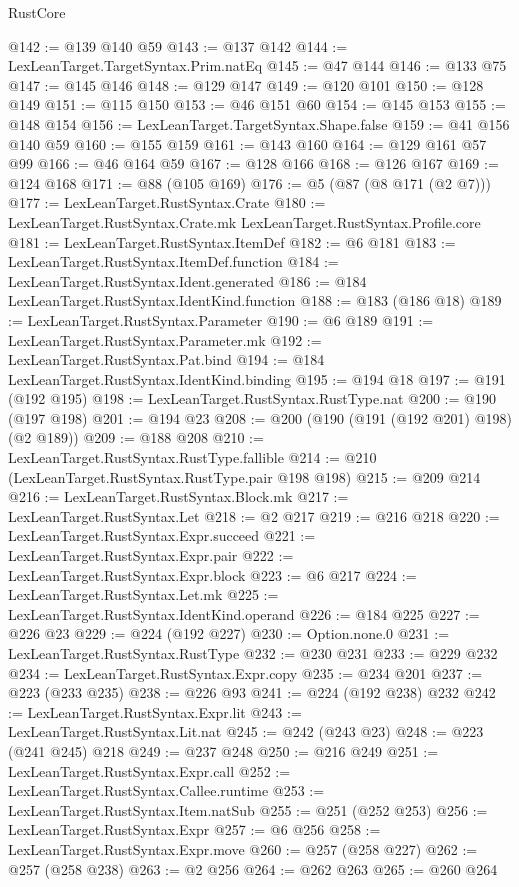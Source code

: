 \begin{lexlean}{RustCore}
\begin{coremodule}
@142 := @139 @140 @59
@143 := @137 @142
@144 := LexLeanTarget.TargetSyntax.Prim.natEq
@145 := @47 @144
@146 := @133 @75
@147 := @145 @146
@148 := @129 @147
@149 := @120 @101
@150 := @128 @149
@151 := @115 @150
@153 := @46 @151 @60
@154 := @145 @153
@155 := @148 @154
@156 := LexLeanTarget.TargetSyntax.Shape.false
@159 := @41 @156 @140 @59
@160 := @155 @159
@161 := @143 @160
@164 := @129 @161 @57 @99
@166 := @46 @164 @59
@167 := @128 @166
@168 := @126 @167
@169 := @124 @168
@171 := @88 (@105 @169)
@176 := @5 (@87 (@8 @171 (@2 @7)))
@177 := LexLeanTarget.RustSyntax.Crate
@180 := LexLeanTarget.RustSyntax.Crate.mk LexLeanTarget.RustSyntax.Profile.core
@181 := LexLeanTarget.RustSyntax.ItemDef
@182 := @6 @181
@183 := LexLeanTarget.RustSyntax.ItemDef.function
@184 := LexLeanTarget.RustSyntax.Ident.generated
@186 := @184 LexLeanTarget.RustSyntax.IdentKind.function
@188 := @183 (@186 @18)
@189 := LexLeanTarget.RustSyntax.Parameter
@190 := @6 @189
@191 := LexLeanTarget.RustSyntax.Parameter.mk
@192 := LexLeanTarget.RustSyntax.Pat.bind
@194 := @184 LexLeanTarget.RustSyntax.IdentKind.binding
@195 := @194 @18
@197 := @191 (@192 @195)
@198 := LexLeanTarget.RustSyntax.RustType.nat
@200 := @190 (@197 @198)
@201 := @194 @23
@208 := @200 (@190 (@191 (@192 @201) @198) (@2 @189))
@209 := @188 @208
@210 := LexLeanTarget.RustSyntax.RustType.fallible
@214 := @210 (LexLeanTarget.RustSyntax.RustType.pair @198 @198)
@215 := @209 @214
@216 := LexLeanTarget.RustSyntax.Block.mk
@217 := LexLeanTarget.RustSyntax.Let
@218 := @2 @217
@219 := @216 @218
@220 := LexLeanTarget.RustSyntax.Expr.succeed
@221 := LexLeanTarget.RustSyntax.Expr.pair
@222 := LexLeanTarget.RustSyntax.Expr.block
@223 := @6 @217
@224 := LexLeanTarget.RustSyntax.Let.mk
@225 := LexLeanTarget.RustSyntax.IdentKind.operand
@226 := @184 @225
@227 := @226 @23
@229 := @224 (@192 @227)
@230 := Option.none.{0}
@231 := LexLeanTarget.RustSyntax.RustType
@232 := @230 @231
@233 := @229 @232
@234 := LexLeanTarget.RustSyntax.Expr.copy
@235 := @234 @201
@237 := @223 (@233 @235)
@238 := @226 @93
@241 := @224 (@192 @238) @232
@242 := LexLeanTarget.RustSyntax.Expr.lit
@243 := LexLeanTarget.RustSyntax.Lit.nat
@245 := @242 (@243 @23)
@248 := @223 (@241 @245) @218
@249 := @237 @248
@250 := @216 @249
@251 := LexLeanTarget.RustSyntax.Expr.call
@252 := LexLeanTarget.RustSyntax.Callee.runtime
@253 := LexLeanTarget.RustSyntax.Item.natSub
@255 := @251 (@252 @253)
@256 := LexLeanTarget.RustSyntax.Expr
@257 := @6 @256
@258 := LexLeanTarget.RustSyntax.Expr.move
@260 := @257 (@258 @227)
@262 := @257 (@258 @238)
@263 := @2 @256
@264 := @262 @263
@265 := @260 @264

\end{coremodule}
\end{lexlean}
